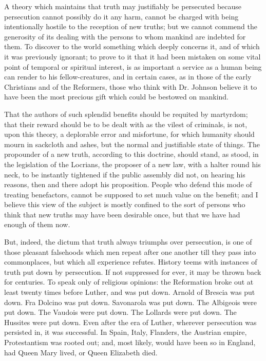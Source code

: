 A theory which maintains that truth may justifiably be persecuted because persecution cannot possibly do it any harm, cannot be charged with being intentionally hostile to the reception of new truths; but we cannot commend the generosity of its dealing with the persons to whom mankind are indebted for them. To discover to the world something which deeply concerns it, and of which it was previously ignorant; to prove to it that it had been mistaken on some vital point of temporal or spiritual interest, is as important a service as a human being can render to his fellow-creatures, and in certain cases, as in those of the early Christians and of the Reformers, those who think with Dr. Johnson believe it to have been the most precious gift which could be bestowed on mankind.\par

That the authors of such splendid benefits should be requited by martyrdom; that their reward should be to be dealt with as the vilest of criminals, is not, upon this theory, a deplorable error and misfortune, for which humanity should mourn in sackcloth and ashes, but the normal and justifiable state of things. The propounder of a new truth, according to this doctrine, should stand, as stood, in the legislation of the Locrians, the proposer of a new law, with a halter round his neck, to be instantly tightened if the public assembly did not, on hearing his reasons, then and there adopt his proposition. People who defend this mode of treating benefactors, cannot be supposed to set much value on the benefit; and I believe this view of the subject is mostly confined to the sort of persons who think that new truths may have been desirable once, but that we have had enough of them now.\par

But, indeed, the dictum that truth always triumphs over persecution, is one of those pleasant falsehoods which men repeat after one another till they pass into commonplaces, but which all experience refutes. History teems with instances of truth put down by persecution. If not suppressed for ever, it may be thrown back for centuries. To speak only of religious opinions: the Reformation broke out at least twenty times before Luther, and was put down. Arnold of Brescia was put down. Fra Dolcino was put down. Savonarola was put down. The Albigeois were put down. The Vaudois were put down. The Lollards were put down. The Hussites were put down. Even after the era of Luther, wherever persecution was persisted in, it was successful. In Spain, Italy, Flanders, the Austrian empire, Protestantism was rooted out; and, most likely, would have been so in England, had Queen Mary lived, or Queen Elizabeth died.\par


